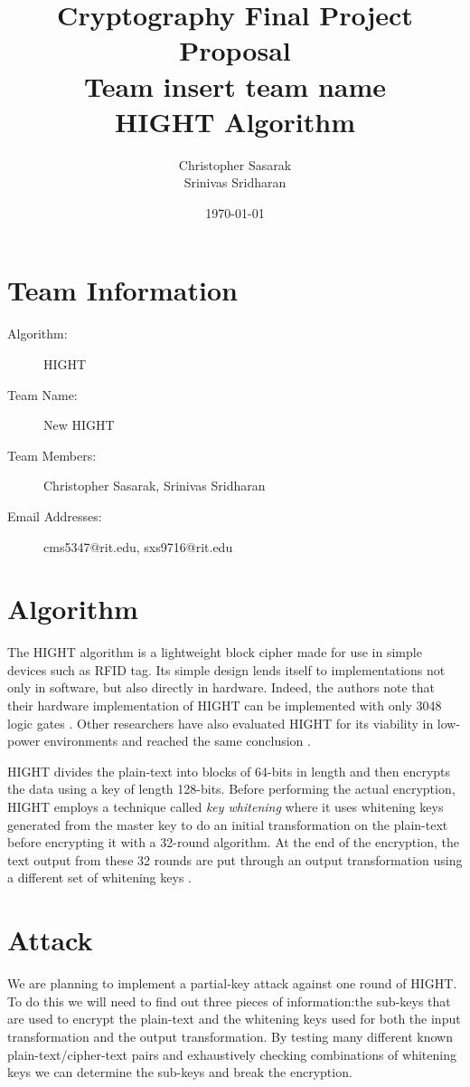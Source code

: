 \documentclass[letterpaper,notitlepage]{article}
\title{Cryptography Final Project Proposal\\Team insert team name\\ HIGHT Algorithm}
\author{Christopher Sasarak\\ Srinivas Sridharan}
\date{\today}
\begin{document}
\maketitle
\thispagestyle{empty}

\section*{Team Information}
\begin{description}
    \item[Algorithm:] HIGHT
    \item[Team Name:] New HIGHT
    \item[Team Members:] Christopher Sasarak, Srinivas Sridharan   
    \item[Email Addresses:] cms5347@rit.edu, sxs9716@rit.edu
\end{description}

\section*{Algorithm}
The HIGHT algorithm\cite{hight} is a lightweight block cipher made for use in simple devices
such as RFID tag. Its simple design lends itself to implementations
not only in software, but also directly in hardware. Indeed, the authors note 
that their hardware implementation of HIGHT can be implemented with only 3048 logic
gates \cite{hight}. Other researchers have also evaluated HIGHT for its viability
in low-power environments and reached the same conclusion 
\cite{hight_implementation}.

HIGHT divides the plain-text into blocks of 64-bits in length and then encrypts
the data using a key of length 128-bits. Before performing the actual encryption, 
HIGHT employs a technique called \emph{key whitening} where it uses whitening
keys generated from the master key to do an initial transformation on the 
plain-text before encrypting it with a 32-round algorithm. At the end of the
encryption, the text output from these 32 rounds are put through an output
transformation using a different set of whitening keys \cite{hight}.

\section*{Attack}
We are planning to implement a partial-key attack against one round of HIGHT.
To do this we will need to find out three pieces of information:the sub-keys that 
are used to encrypt the plain-text and the whitening keys used for both the
input transformation and the output transformation. By testing many different 
known plain-text/cipher-text pairs and exhaustively checking combinations of 
whitening keys we can determine the sub-keys and break the encryption.




\end{document}
